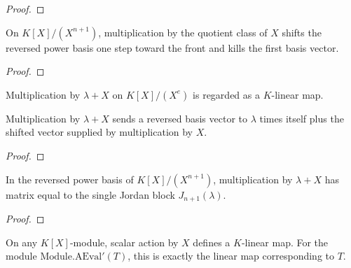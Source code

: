 \begin{proof}
  \leanok
\end{proof}

\begin{theorem}
  \label{thm:root_shift_reverse_basis}
  \leanok
  On \(K[X]/(X^{n+1})\), multiplication by the quotient class of \(X\) shifts
  the reversed power basis one step toward the front and kills the first basis
  vector.
\end{theorem}

\begin{proof}
  \leanok
\end{proof}

\begin{definition}
  \label{def:root_plus_scalar_linear}
  \leanok
  Multiplication by \(\lambda+X\) on \(K[X]/(X^e)\) is regarded as a
  \(K\)-linear map.
\end{definition}

\begin{theorem}
  \label{thm:root_plus_scalar_action}
  \leanok
  Multiplication by \(\lambda+X\) sends a reversed basis vector to
  \(\lambda\) times itself plus the shifted vector supplied by multiplication
  by \(X\).
\end{theorem}

\begin{proof}
  \leanok
\end{proof}

\begin{theorem}
  \label{thm:root_plus_scalar_single_block}
  \leanok
  In the reversed power basis of \(K[X]/(X^{n+1})\), multiplication by
  \(\lambda+X\) has matrix equal to the single Jordan block
  \(J_{n+1}(\lambda)\).
\end{theorem}

\begin{proof}
  \leanok
\end{proof}

\begin{definition}
  \label{def:x_smul_linear}
  \leanok
  On any \(K[X]\)-module, scalar action by \(X\) defines a \(K\)-linear map.
  For the module \(\mathrm{Module.AEval'}(T)\), this is exactly the linear
  map corresponding to \(T\).
\end{definition}

